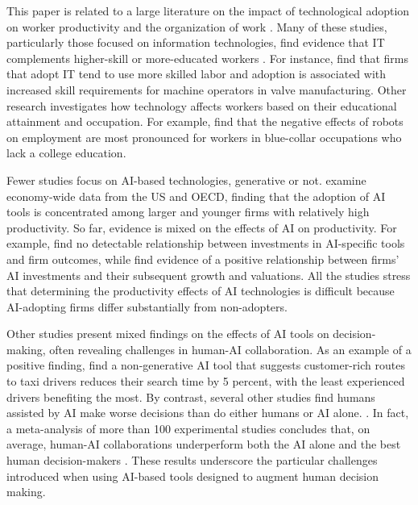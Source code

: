 \documentclass[11pt]{article}
\begin{document}
This paper is related to a large literature on the impact of technological adoption on worker productivity and the organization of work \citep[e.g.][]{rosen1981, autorComputingInequalityHave1998, BrynHittJEP2000, atheystern2002, bartel2007, acemoglu2007, bloom2014, michaelsHasIctPolarized2014, garicano2015, hoffman2018, acemogluRobotsJobsEvidence2020, feltenOccupationalHeterogeneityExposure2023}.  Many of these studies, particularly those focused on information technologies, find evidence that IT complements higher-skill or more-educated workers \citep{bres2002,akermanSkillComplementarityBroadband2015,taniguchiICTCapitalSkillComplementarity2022}. For instance, \citet{bartel2007} find that firms that adopt IT tend to use more skilled labor and adoption is associated with increased skill requirements for machine operators in valve manufacturing. Other research investigates how technology affects workers based on their educational attainment and occupation. For example,  \citet{acemogluRobotsJobsEvidence2020} find that the negative effects of robots on employment are most pronounced for workers in blue-collar occupations who lack a college education. 

Fewer studies focus on AI-based technologies, generative or not.  \citet{zolas2020, acemoglu2022,  calvino2023} examine economy-wide data from the US and OECD, finding that the adoption of AI tools is concentrated among larger and younger firms with relatively high productivity. So far, evidence is mixed on the effects of AI on productivity. For example, \citet{acemoglu2022} find no detectable relationship between investments in AI-specific tools and firm outcomes, while \citet{babina2022} find evidence of a positive relationship between firms' AI investments and their subsequent growth and valuations. All the studies stress that determining the productivity effects of AI technologies is difficult because AI-adopting firms differ substantially from non-adopters. 

Other studies present mixed findings on the effects of AI tools on decision-making, often revealing challenges in human-AI collaboration. As an example of a positive finding, \citet{kanazawa2022} find a non-generative AI tool that suggests customer-rich routes to taxi drivers reduces their search time by 5 percent, with the least experienced drivers benefiting the most. By contrast, several other studies find humans assisted by AI make worse decisions than do either humans or AI alone. \citep{hoffman2018, 
poursabzisangdeh2021, angelova2023, agrawal2023}. In fact, a meta-analysis of more than 100 experimental studies concludes that, on average, human-AI collaborations underperform both the AI alone and the best human decision-makers \citep{vaccaro2024combinationshumansaiuseful}. These results underscore the particular challenges introduced when using AI-based tools designed to augment human decision making.  
\end{document}
